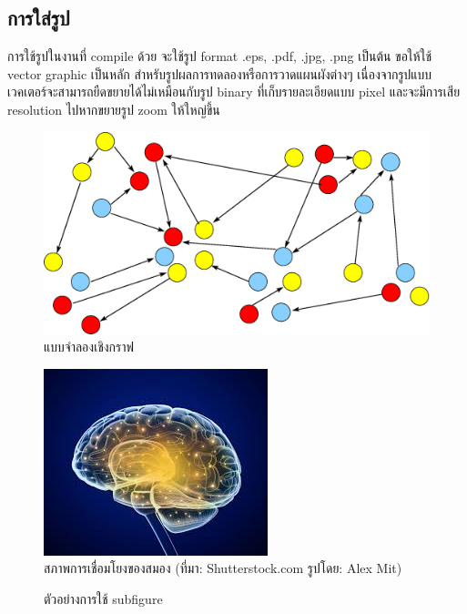 \documentclass[11pt,a4paper]{article}
\begin{document}
\subsection{การใส่รูป}
การใช้รูปในงานที่ compile ด้วย \XeLaTeX จะใช้รูป format .eps, .pdf, .jpg, .png เป็นต้น ขอให้ใช้ vector graphic เป็นหลัก สำหรับรูปผลการทดลองหรือการวาดแผนผังต่างๆ เนื่องจากรูปแบบเวคเตอร์จะสามารถยืดขยายได้ไม่เหมือนกับรูป binary ที่เก็บรายละเอียดแบบ pixel และจะมีการเสีย resolution ไปหากขยายรูป zoom ให้ใหญ่ขึ้น
\begin{figure}[ht]
	\begin{center}
		\includegraphics[width=0.7\linewidth]{gm.eps}
		\caption{แบบจำลองเชิงกราฟ}
	\end{center}
\end{figure}

\begin{figure}[h!]
	\begin{center}
		\includegraphics[width=0.5\linewidth]{brain.jpg}
		\caption{สภาพการเชื่อมโยงของสมอง (ที่มา: Shutterstock.com รูปโดย: Alex Mit)}
	\end{center}
\end{figure}

\begin{figure}
\centering
{} 
\caption{ตัวอย่างการใช้ subfigure}
\end{figure}
\end{document}
